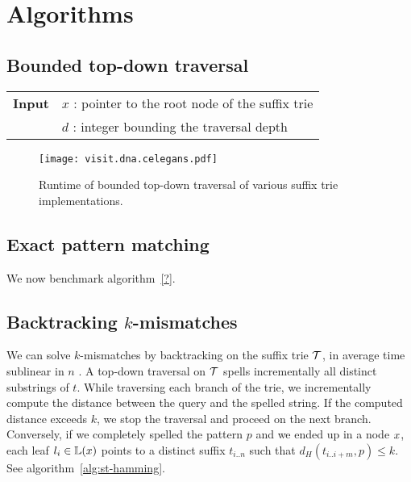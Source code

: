 \section{Algorithms}

\subsection{Bounded top-down traversal}

\begin{center}
\begin{minipage}[t]{.7\textwidth}
\begin{algorithm}[H]
\label{alg:st-dfs}
\begin{tabular}{ll}
\textbf{Input}  & $x$ : pointer to the root node of the suffix trie\\
 			    & $d$ : integer bounding the traversal depth\\
\end{tabular}
\begin{algorithmic}[1]
		\Repeat
			\State {}
		\Until {}
	\EndIf
\EndIf
\end{algorithmic}
\end{algorithm}
\end{minipage}
\end{center}

\begin{figure}[h]
\begin{center}
\caption[Top-down traversal runtime]{Runtime of bounded top-down traversal of various suffix trie implementations.}
\label{fig:visit-dna}
\texttt{[image: visit.dna.celegans.pdf]}
\end{center}
\end{figure}

\subsection{Exact pattern matching}

We now benchmark algorithm~\ref{?}.

\subsection{Backtracking $k$-mismatches}

We can solve $k$-mismatches by backtracking \citep{Ukkonen1993, Baeza1999} on the suffix trie $\mathcal {T}$, in average time sublinear in $n$ \citep{Navarro2000}.
A top-down traversal on $\mathcal {T}$ spells incrementally all distinct substrings of $t$.
While traversing each branch of the trie, we incrementally compute the distance between the query and the spelled string.
If the computed distance exceeds $k$, we stop the traversal and proceed on the next branch.
Conversely, if we completely spelled the pattern $p$ and we ended up in a node $x$, each leaf $l_i \in \mathbb {L}(x)$ points to a distinct suffix $t_{i..n}$ such that $d_H(t_{i..i+m}, p) \leq k$.
See algorithm~\ref{alg:st-hamming}.

